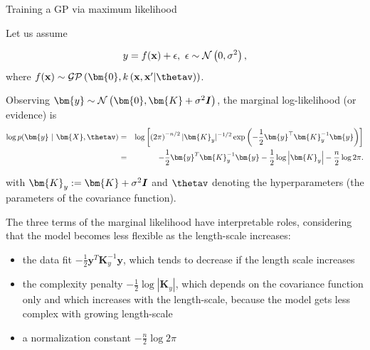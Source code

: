 \documentclass[11pt,compress,t,notes=noshow, xcolor=table]{beamer}
\begin{document}
\begin{vbframe}{Training a GP via maximum likelihood}

Let us assume 

$$
	y = f(\mathbf{x}) + \epsilon, ~ \epsilon \sim \mathcal{N}\left(0, \sigma^2\right),
$$
where $\fx \sim \mathcal{GP}\left(\bm{0}, k\left(\xv, \xv^\prime | \thetav \right)\right)$. 

\lz 

Observing $\bm{y} \sim \mathcal{N}\left(\bm{0}, \bm{K} + \sigma^2 \id\right)$, the marginal log-likelihood (or evidence) is
\begin{eqnarray*}
\log p(\bm{y} ~|~ \bm{X}, \thetav) &=& \log \left[\left(2 \pi\right)^{-n / 2} |\bm{K}_y|^{-1 / 2} \exp\left(- \frac{1}{2} \bm{y}^\top \bm{K}_y^{-1} \bm{y}\right) \right]\\
&=& -\frac{1}{2}\bm{y}^T\bm{K}_y^{-1} \bm{y} - \frac{1}{2} \log \left| \bm{K}_y \right| - \frac{n}{2} \log 2\pi. 
\end{eqnarray*}

with $\bm{K}_y:=\bm{K} + \sigma^2 \id$ and $\thetav$ denoting the hyperparameters (the parameters of the covariance function). 

\framebreak


The three terms of the marginal likelihood have interpretable roles, considering that 
the model becomes less flexible as the length-scale increases:

\begin{itemize}
\item the data fit $-\frac{1}{2}\bm{y}^T\bm{K}_y^{-1} \bm{y}$, which tends to decrease if the length scale increases
\item the complexity penalty $- \frac{1}{2} \log \left| \bm{K}_y \right|$, which depends on the covariance function only and which increases with the length-scale, because the model gets less complex with growing length-scale
\item a normalization constant $- \frac{n}{2} \log 2\pi$
\end{itemize}

\end{vbframe}
\end{document}
